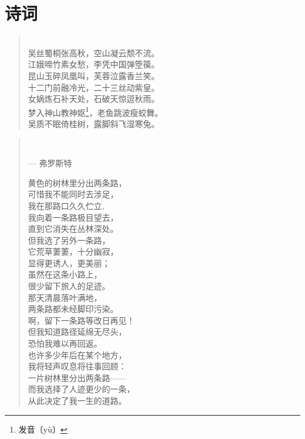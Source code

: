 \chapter{诗词}

\begin{center}
\begin{quotation}
\centering {} \vspace{5mm} \\
吴丝蜀桐张高秋，空山凝云颓不流。\\
江娥啼竹素女愁，李凭中国弹箜篌。\\
昆山玉碎凤凰叫，芙蓉泣露香兰笑。\\
十二门前融冷光，二十三丝动紫皇。\\
女娲炼石补天处，石破天惊逗秋雨。\\
梦入神山教神妪\footnote{发音〔yù〕}，老鱼跳波瘦蛟舞。\\
吴质不眠倚桂树，露脚斜飞湿寒兔。 \\
\end{quotation}
\end{center}

\newpage
\begin{center}
\begin{quotation}
\centering {} \vspace{2mm} \\
\begin{flushright}
--- 弗罗斯特\\
\end{flushright}
\vspace{1mm}
黄色的树林里分出两条路，\\
可惜我不能同时去涉足，\\
我在那路口久久伫立, \\
我向着一条路极目望去，\\
直到它消失在丛林深处。\\
但我选了另外一条路，\\
它荒草萋萋，十分幽寂，\\
显得更诱人，更美丽；\\
虽然在这条小路上，\\
很少留下旅人的足迹。\\
那天清晨落叶满地，\\
两条路都未经脚印污染。\\
啊，留下一条路等改日再见！\\
但我知道路径延绵无尽头，\\
恐怕我难以再回返。\\
也许多少年后在某个地方，\\
我将轻声叹息将往事回顾：\\
一片树林里分出两条路——\\
而我选择了人迹更少的一条，\\
从此决定了我一生的道路。\\
\end{quotation}
\end{center}

